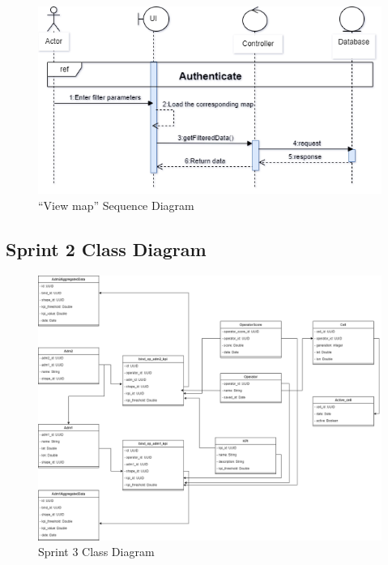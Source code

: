 \begin{figure}[H]
   \begin{center}
    \includegraphics[width=\textwidth]{images/sprint3/cartographySeq.png}
    \caption{“View map” Sequence Diagram}
    \label{fig:enter-label}
   \end{center}
\end{figure}

\subsection{Sprint 2 Class Diagram}
\begin{figure}[H]
   
    
    \includegraphics[width=\textwidth]{images/sprint3/Sprint3ClassDiag.png}
    \caption{Sprint 3 Class Diagram}
    \label{fig:enter-label}
    
\end{figure}
\newpage

